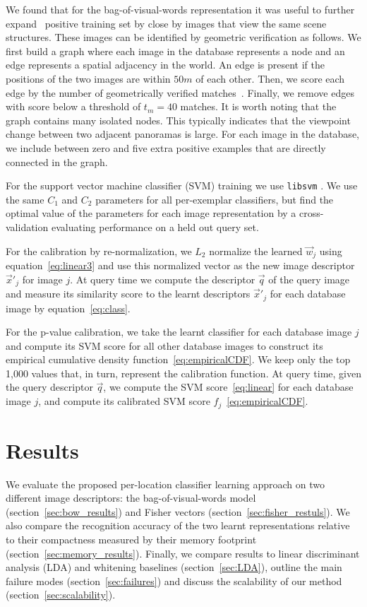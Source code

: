       We found that for the bag-of-visual-words representation it was useful to further expand~\cite{Chum07b} positive training set by close by images that view the same scene structures. These images can be identified by geometric verification \cite{Philbin07}  {as follows.}
      {
        We first build a graph where each image in the database represents a node and an edge represents a spatial adjacency in the world. An edge is present if the positions of the two images are within $50m$ of each other.
        Then, we score each edge by the number of geometrically verified matches~\cite{Philbin07}. Finally, we remove edges with score below a threshold of $t_m = 40$ matches. 
        It is worth noting that the graph contains many isolated nodes. This typically indicates that the viewpoint change between two adjacent panoramas is large. For each image in the database, we include between zero and five extra positive examples that are directly connected in the graph.
      }

      For the support vector machine classifier (SVM) training we use {\tt libsvm} \cite{libsvm}. We use the same $C_1$ and $C_2$ parameters for all per-exemplar classifiers, but find the optimal value of the parameters for each image representation by a cross-validation evaluating performance on a held out query set.

      For the calibration by re-normalization, we $L_2$ normalize the learned $\vec{w}_j$ using equation~\eqref{eq:linear3} and use this normalized vector as the new image descriptor $\vec{x}'_j$ for image $j$. At query time we compute the descriptor $\vec{q}$ of the query image and measure its similarity score to the learnt descriptors $\vec{x}'_j$ for each database image by equation~\eqref{eq:class}.

      For the p-value calibration, we take the learnt classifier for each database image $j$ and compute its SVM score for all other database images to construct its empirical cumulative density function~\eqref{eq:empiricalCDF}. We keep only the top 1,000 values that, in turn, represent the calibration function. At query time, given the query descriptor $\vec{q}$, we compute the SVM score~\eqref{eq:linear} for each database image $j$, and compute its calibrated SVM score $f_j$~\eqref{eq:empiricalCDF}.


\section{Results}
\label{sec:results}
  We evaluate the proposed per-location classifier learning approach on two different image descriptors: the bag-of-visual-words model (section~\ref{sec:bow_results}) and Fisher vectors (section~\ref{sec:fisher_restuls}).  We also compare the recognition accuracy of the two learnt representations relative to their compactness measured by their memory footprint (section~\ref{sec:memory_results}).
  {  
    Finally, we compare results to linear discriminant analysis (LDA) and whitening baselines (section~\ref{sec:LDA}), outline the main failure modes (section~\ref{sec:failures}) and discuss the scalability of our method (section~\ref{sec:scalability}).  
  } 
  
